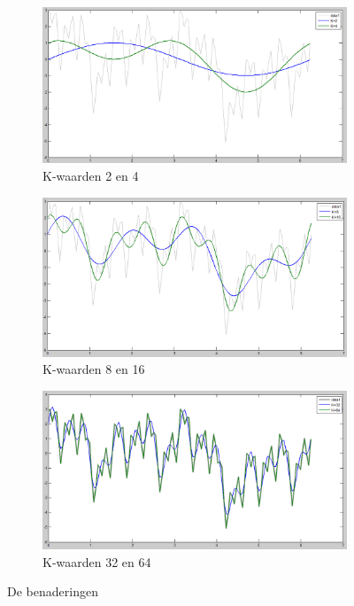 \documentclass[a4paper, 12pt, titlepage]{report}
\begin{document}
\begin{figure}
\centering
\begin{subfigure}{.5\textwidth}
  \centering
  \includegraphics[width=\linewidth]{K2K4.png}
  \caption{K-waarden 2 en 4}
  \label{fig:sub1}
\end{subfigure}%
\begin{subfigure}{.5\textwidth}
  \centering
  \includegraphics[width=\linewidth]{K8K16.png}
  \caption{K-waarden 8 en 16}
  \label{fig:sub2}
\end{subfigure}
\begin{subfigure}{.5\textwidth}
  \centering
  \includegraphics[width=\linewidth]{K32K64.png}
  \caption{K-waarden 32 en 64}
  \label{fig:sub3}
\end{subfigure}
\caption{De benaderingen}
\label{fig:test}
\end{figure}
\end{document}
